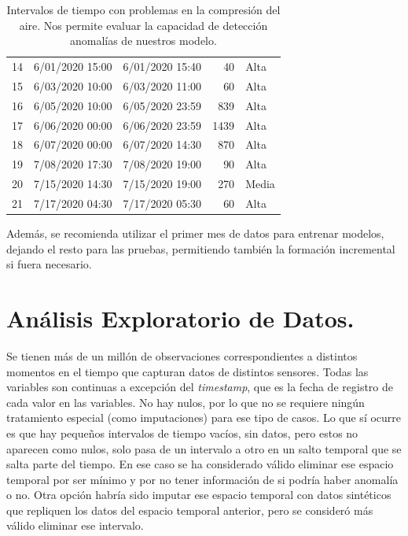 \documentclass[12pt,letterpaper]{article}
\begin{document}
\begin{table}[htp]
\begin{tabular}{cllrl}
14           & 6/01/2020 15:00          & 6/01/2020 15:40           & 40                 & Alta              \\
15           & 6/03/2020 10:00          & 6/03/2020 11:00           & 60                 & Alta              \\
16           & 6/05/2020 10:00          & 6/05/2020 23:59           & 839                & Alta              \\
17           & 6/06/2020 00:00          & 6/06/2020 23:59           & 1439               & Alta              \\
18           & 6/07/2020 00:00          & 6/07/2020 14:30           & 870                & Alta              \\
19           & 7/08/2020 17:30          & 7/08/2020 19:00           & 90                 & Alta              \\
20           & 7/15/2020 14:30          & 7/15/2020 19:00           & 270                & Media            \\ 
21           & 7/17/2020 04:30          & 7/17/2020 05:30           & 60                 & Alta              \\ \hline
\end{tabular}
    \caption{
    Intervalos de tiempo con problemas en la compresión del aire.
    Nos permite evaluar la capacidad de detección anomalías de nuestros modelo.}
    \label{tab:Reportes}
\end{table}

Además, se recomienda utilizar el primer mes de datos para entrenar modelos, dejando el resto para las pruebas, permitiendo también la formación incremental si fuera necesario.


\section{Análisis Exploratorio de Datos.}
Se tienen más de un millón de observaciones correspondientes a distintos momentos en el tiempo que capturan datos de distintos sensores. Todas las variables son continuas a excepción del \textit{timestamp}, que es la fecha de registro de cada valor en las variables.
No hay nulos, por lo que no se requiere ningún tratamiento especial (como imputaciones) para ese tipo de casos. Lo que sí ocurre es que hay pequeños intervalos de tiempo vacíos, sin datos, pero estos no aparecen como nulos, solo pasa de un intervalo a otro en un salto temporal que se salta parte del tiempo. En ese caso se ha considerado válido eliminar ese espacio temporal por ser mínimo y por no tener información de si podría haber anomalía o no. Otra opción habría sido imputar ese espacio temporal con datos sintéticos que repliquen los datos del espacio temporal anterior, pero se consideró más válido eliminar ese intervalo.
\end{document}
